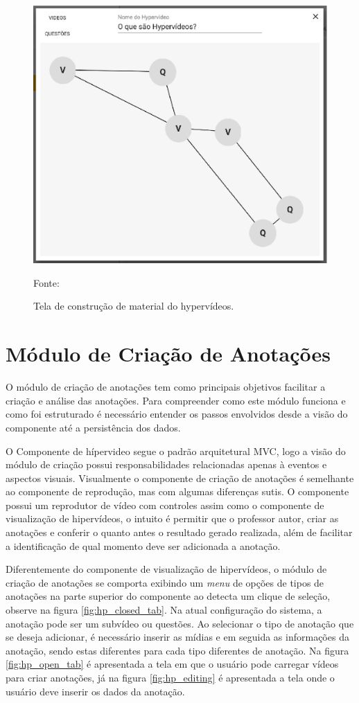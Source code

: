 \begin{figure}[h!]
	\centering
  	\includegraphics[width=.7\linewidth]{figuras/construcao_hyp.eps}
  	\caption{Tela de construção de material do hypervídeos.}
	\small{Fonte: \cite{arthurtcc}}
  	\label{fig:hyp_constr}
\end{figure} 

\section{Módulo de Criação de Anotações}

O módulo de criação de anotações tem como principais objetivos facilitar a criação e análise das anotações. Para compreender como este módulo funciona e como foi estruturado é necessário entender os passos envolvidos desde a visão do componente até a persistência dos dados.

O Componente de hípervideo segue o padrão arquitetural MVC, logo a visão do módulo de criação possui responsabilidades relacionadas apenas à eventos e aspectos visuais. Visualmente o componente de criação de anotações é semelhante ao componente de reprodução, mas com algumas diferenças sutis. O componente possui um reprodutor de vídeo com controles assim como o componente de visualização de hipervídeos, o intuito é permitir que o professor autor, criar as anotações e conferir o quanto antes o resultado gerado realizada, além de facilitar a identificação de qual momento deve ser adicionada a anotação.

Diferentemente do componente de visualização de hipervídeos, o módulo de criação de anotações se comporta exibindo um \textit{menu} de opções de tipos de anotações na parte superior do componente ao detecta um clique de seleção, observe na figura \ref{fig:hp_closed_tab}. Na atual configuração do sistema, a anotação pode ser um subvídeo ou questões. Ao selecionar o tipo de anotação que se deseja adicionar, é necessário inserir as mídias e em seguida as informações da anotação, sendo estas diferentes para cada tipo diferentes de anotação. Na figura \ref{fig:hp_open_tab} é apresentada a tela em que o usuário pode carregar vídeos para criar anotações, já na figura \ref{fig:hp_editing} é apresentada a tela onde o usuário deve inserir os dados da anotação.

